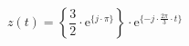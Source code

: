 \[
z(t) =  \left \{ \frac{3}{2} \cdot \textrm{e}^{\{ j \cdot \pi \}} \right \} \cdot \textrm{e}^{\{ -j \cdot \frac{2\pi}{3} \cdot t \}}
\]
